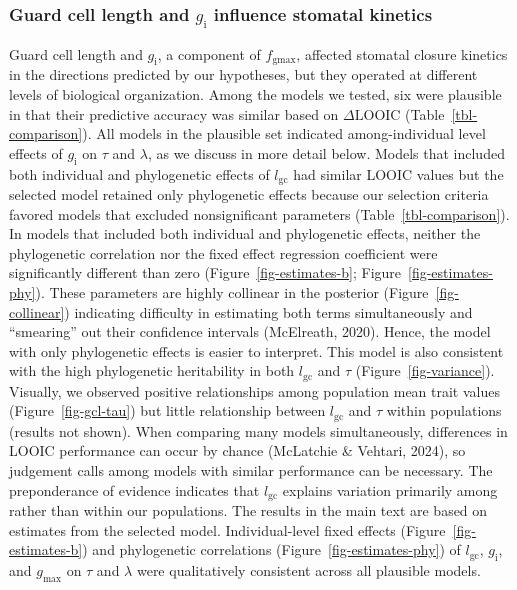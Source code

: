 \documentclass[
  letterpaper,
  DIV=11,
  numbers=noendperiod]{scrartcl}
\newcommand{\fgmax}{$f_\mathrm{gmax}$}
\newcommand{\gcl}{$l_\mathrm{gc}$}
\newcommand{\gi}{$g_\mathrm{i}$}
\newcommand{\gmax}{$g_\mathrm{max}$}
\begin{document}
\subsubsection{\texorpdfstring{Guard cell length and \gi{} influence
stomatal
kinetics}{Guard cell length and  influence stomatal kinetics}}\label{guard-cell-length-and-influence-stomatal-kinetics}

Guard cell length and \gi{}, a component of \fgmax, affected stomatal
closure kinetics in the directions predicted by our hypotheses, but they
operated at different levels of biological organization. Among the
models we tested, six were plausible in that their predictive accuracy
was similar based on \(\Delta \mathrm{LOOIC}\)
(Table~\ref{tbl-comparison}). All models in the plausible set indicated
among-individual level effects of \gi{} on \(\tau\) and \(\lambda\), as
we discuss in more detail below. Models that included both individual
and phylogenetic effects of \gcl{} had similar LOOIC values but the
selected model retained only phylogenetic effects because our selection
criteria favored models that excluded nonsignificant parameters
(Table~\ref{tbl-comparison}). In models that included both individual
and phylogenetic effects, neither the phylogenetic correlation nor the
fixed effect regression coefficient were significantly different than
zero (Figure~\ref{fig-estimates-b}; Figure~\ref{fig-estimates-phy}).
These parameters are highly collinear in the posterior
(Figure~\ref{fig-collinear}) indicating difficulty in estimating both
terms simultaneously and ``smearing'' out their confidence intervals
(McElreath, 2020). Hence, the model with only phylogenetic effects is
easier to interpret. This model is also consistent with the high
phylogenetic heritability in both \gcl{} and \(\tau\)
(Figure~\ref{fig-variance}). Visually, we observed positive
relationships among population mean trait values
(Figure~\ref{fig-gcl-tau}) but little relationship between \gcl{} and
\(\tau\) within populations (results not shown). When comparing many
models simultaneously, differences in LOOIC performance can occur by
chance (McLatchie \& Vehtari, 2024), so judgement calls among models
with similar performance can be necessary. The preponderance of evidence
indicates that \gcl{} explains variation primarily among rather than
within our populations. The results in the main text are based on
estimates from the selected model. Individual-level fixed effects
(Figure~\ref{fig-estimates-b}) and phylogenetic correlations
(Figure~\ref{fig-estimates-phy}) of \gcl, \gi, and \gmax{} on \(\tau\)
and \(\lambda\) were qualitatively consistent across all plausible
models.
\end{document}
